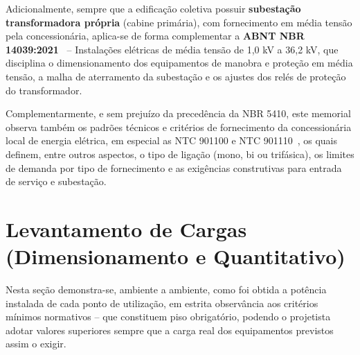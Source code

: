 \documentclass[12pt,openright,oneside,a4paper,brazil]{abntex2}
\newcommand{\norma}[1]{\textbf{#1}}
\begin{document}
Adicionalmente, sempre que a edificação coletiva possuir \textbf{subestação
transformadora própria} (cabine primária), com fornecimento em média tensão
pela concessionária, aplica-se de forma complementar a \norma{ABNT NBR 14039:2021}~\cite{nbr14039} -- {Instalações elétricas de média tensão de 1,0 kV a
36,2 kV}, que disciplina o dimensionamento dos equipamentos de manobra e
proteção em média tensão, a malha de aterramento da subestação e os ajustes
dos relés de proteção do transformador.

Complementarmente, e sem prejuízo da precedência da NBR 5410, este memorial
observa também os padrões técnicos e critérios de fornecimento da
concessionária local de energia elétrica, em especial as NTC 901100 e NTC 901110~\cite{ntc901100,ntc901110}, os quais definem, entre outros
aspectos, o tipo de ligação (mono, bi ou trifásica), os limites de demanda
por tipo de fornecimento e as exigências construtivas para entrada de
serviço e subestação.

\section{Levantamento de Cargas (Dimensionamento e Quantitativo)}

\hspace{1.27cm}Nesta seção demonstra-se, ambiente a ambiente, como foi obtida a potência
instalada de cada ponto de utilização, em estrita observância aos critérios
mínimos normativos -- que constituem {piso obrigatório}, podendo o
projetista adotar valores superiores sempre que a carga real dos
equipamentos previstos assim o exigir.
\end{document}
